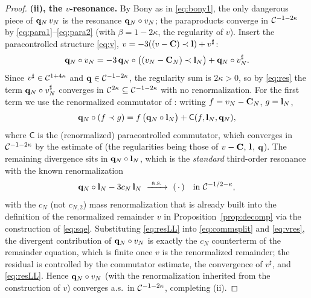 \begin{proof}
\medskip
\textbf{(ii), the $v$-resonance.} By Bony as in \eqref{eq:bony1}, the only dangerous
piece of $\mathbf{q}_N\,v_N$ is the resonance $\mathbf{q}_N\circ v_N$; the paraproducts
converge in $\mathcal{C}^{-1-2\kappa}$ by \eqref{eq:para1}--\eqref{eq:para2} (with
$\beta=1-2\kappa$, the regularity of $v$). Insert the paracontrolled structure
\eqref{eq:v}, $v=-3((v-\mathbf{C})\prec\mathbf{l})+v^\sharp$:
\begin{equation}\label{eq:vres}
\mathbf{q}_N\circ v_N=-3\,\mathbf{q}_N\circ\bigl((v_N-\mathbf{C}_N)\prec\mathbf{l}_N\bigr)+\mathbf{q}_N\circ v_N^\sharp .
\end{equation}
Since $v^\sharp\in\mathcal{C}^{1+4\kappa}$ and $\mathbf{q}\in\mathcal{C}^{-1-2\kappa}$, the regularity
sum is $2\kappa>0$, so by \eqref{eq:res} the term $\mathbf{q}_N\circ v_N^\sharp$ converges
in $\mathcal{C}^{2\kappa}\subseteq\mathcal{C}^{-1-2\kappa}$ with no renormalization. For the first
term we use the renormalized commutator of \cite{CC18}: writing $f=v_N-\mathbf{C}_N$,
$g=\mathbf{l}_N$,
\begin{equation}\label{eq:commsplit}
\mathbf{q}_N\circ(f\prec g)=f\,\bigl(\mathbf{q}_N\circ\mathbf{l}_N\bigr)+\mathsf C(f,\mathbf{l}_N,\mathbf{q}_N),
\end{equation}
where $\mathsf C$ is the (renormalized) paracontrolled commutator, which converges in
$\mathcal{C}^{-1-2\kappa}$ by the estimate of \cite{CC18,GIP15} (the regularities being
those of $v-\mathbf{C}$, $\mathbf{l}$, $\mathbf{q}$). The remaining divergence sits in
$\mathbf{q}_N\circ\mathbf{l}_N$, which is the \emph{standard} third-order resonance with the
known renormalization
\begin{equation}\label{eq:resLL}
\qoneLsq_N\circ\qoneLin_N-3c_N\,\qoneLin_N\ \xrightarrow{\ \mathrm{a.s.}\ }\ (\,\cdot\,)\quad\text{in }\qoneC^{-1/2-\kappa},
\end{equation}
with the $c_N$ (not $c_{N,2}$) mass renormalization that is already built into the
definition of the renormalized remainder $v$ in Proposition~\ref{prop:decomp} via the
construction of \eqref{eq:sqe}. Substituting \eqref{eq:resLL} into \eqref{eq:commsplit}
and \eqref{eq:vres}, the divergent contribution of $\mathbf{q}_N\circ v_N$ is exactly the
$c_N$ counterterm of the remainder equation, which is finite once $v$ is the
renormalized remainder; the residual is controlled by the commutator estimate, the
convergence of $v^\sharp$, and \eqref{eq:resLL}. Hence $\mathbf{q}_N\circ v_N$ (with the
renormalization inherited from the construction of $v$) converges a.s.\ in
$\mathcal{C}^{-1-2\kappa}$, completing (ii).
\end{proof}

